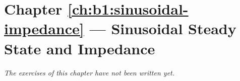 \section*{Chapter \ref{ch:b1:sinusoidal-impedance} --- Sinusoidal Steady State and Impedance}


\emph{The exercises of this chapter have not been written yet.}
